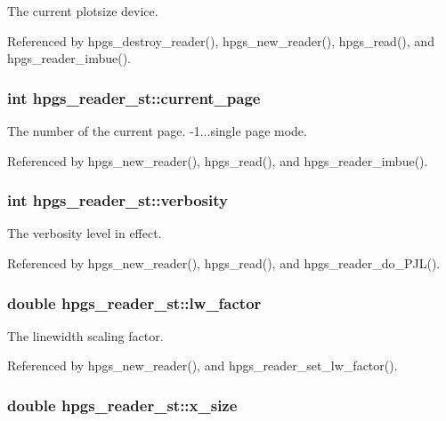 The current plotsize device. 

Referenced by hpgs\_\-destroy\_\-reader(), hpgs\_\-new\_\-reader(), hpgs\_\-read(), and hpgs\_\-reader\_\-imbue().
\subsubsection[current\_\-page]{\setlength{\rightskip}{0pt plus 5cm}int {\bf hpgs\_\-reader\_\-st::current\_\-page}}\label{structhpgs__reader__st_623cad219ac749b60933354b3c19ff12}


The number of the current page. -1...single page mode. 

Referenced by hpgs\_\-new\_\-reader(), hpgs\_\-read(), and hpgs\_\-reader\_\-imbue().
\subsubsection[verbosity]{\setlength{\rightskip}{0pt plus 5cm}int {\bf hpgs\_\-reader\_\-st::verbosity}}\label{structhpgs__reader__st_84b00d202beed5194204a34c46121d09}


The verbosity level in effect. 

Referenced by hpgs\_\-new\_\-reader(), hpgs\_\-read(), and hpgs\_\-reader\_\-do\_\-PJL().
\subsubsection[lw\_\-factor]{\setlength{\rightskip}{0pt plus 5cm}double {\bf hpgs\_\-reader\_\-st::lw\_\-factor}}\label{structhpgs__reader__st_8d52bb49d1520e0f7478e8da42779f3b}


The linewidth scaling factor. 

Referenced by hpgs\_\-new\_\-reader(), and hpgs\_\-reader\_\-set\_\-lw\_\-factor().
\subsubsection[x\_\-size]{\setlength{\rightskip}{0pt plus 5cm}double {\bf hpgs\_\-reader\_\-st::x\_\-size}}\label{structhpgs__reader__st_d803c4e43446a11d580858270508d767}


